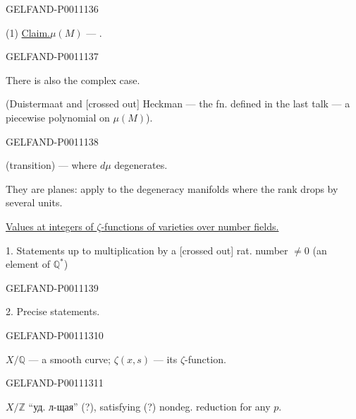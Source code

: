 \begin{GelfandAdjacentEvidence}{GELFAND-P001113}{6}


(1) \underline{Claim.}\quad $\mu(M)$ — .

\end{GelfandAdjacentEvidence}
\begin{GelfandAdjacentEvidence}{GELFAND-P001113}{7}


There is also the complex case.

(Duistermaat and [crossed out] Heckman — the fn. defined in the last talk — a piecewise polynomial on $\mu(M)$).
\end{GelfandAdjacentEvidence}
\begin{GelfandAdjacentEvidence}{GELFAND-P001113}{8}


 (transition) — where $d\mu$ degenerates.

They are planes: apply to the degeneracy manifolds where the rank drops by several units.


\underline{Values at integers of $\zeta$-functions of varieties over number fields.}

1. Statements up to multiplication by a [crossed out] rat. number $\ne0$ (an element of $\mathbb Q^*$)
\end{GelfandAdjacentEvidence}
\begin{GelfandAdjacentEvidence}{GELFAND-P001113}{9}


2. Precise statements.

\end{GelfandAdjacentEvidence}
\begin{GelfandAdjacentEvidence}{GELFAND-P001113}{10}


$X/\mathbb Q$ — a smooth curve; \quad $\zeta(x,s)$ — its $\zeta$-function.

\end{GelfandAdjacentEvidence}
\begin{GelfandAdjacentEvidence}{GELFAND-P001113}{11}


$X/\mathbb Z$ “уд. л-щая” (?), satisfying (?) nondeg. reduction for any $p$.
\end{GelfandAdjacentEvidence}
